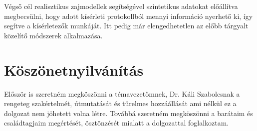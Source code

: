 Végső cél realisztikus zajmodellek segítségével szintetikus adatokat előállítva megbecsülni, hogy adott kísérleti protokollból mennyi információ nyerhető ki, így segítve a kísérletezők munkáját. Itt pedig már elengedhetetlen az előbb tárgyalt közelítő módszerek alkalmazása.



\section*{Köszönetnyilvánítás} 
Először is szeretném megköszönni a témavezetőmnek, Dr. Káli Szabolcsnak a rengeteg szakértelmét, útmutatását és türelmes hozzáállását ami nélkül ez a dolgozat nem jöhetett volna létre. Továbbá szeretném megköszönni a barátaim és családtagjaim megértését, ösztönzését mialatt a dolgozattal foglalkoztam.